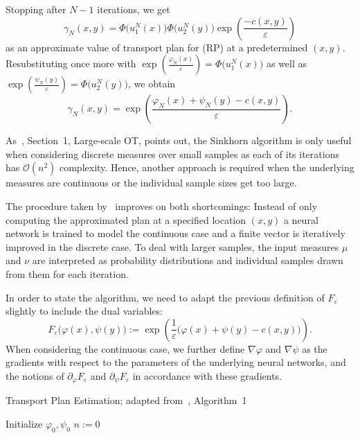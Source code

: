 Stopping after $N - 1$ iterations, we get
\[ \gamma_N(x, y) = \Phi\big( u_1^N(x) \big) \Phi\big( u_2^N(y) \big) \exp\left( \frac{- c(x, y)}{\varepsilon} \right) \]
as an approximate value of transport plan for (RP) at a predetermined $(x, y)$. Resubstituting once more with $\exp\left( \frac{\varphi_N(x)}{\varepsilon} \right) = \Phi\big( u_1^N(x) \big)$ as well as $\exp\left( \frac{\psi_N(y)}{\varepsilon} \right) = \Phi\big( u_2^N(y) \big)$, we obtain
\begin{equation}\label{RegApprTransPlan}
	\gamma_N(x, y) = \exp\left( \frac{\varphi_N(x) + \psi_N(y) - c(x, y)}{\varepsilon} \right).
\end{equation}

As~\cite{Seg2018}, Section~1, Large-scale OT, points out, the Sinkhorn algorithm is only useful when considering discrete measures over small samples as each of its iterations has $\mathcal{O}(n^2)$ complexity. Hence, another approach is required when the underlying measures are continuous or the individual sample sizes get too large.

The procedure taken by~\cite{Seg2018} improves on both shortcomings: Instead of only computing the approximated plan at a specified location $(x, y)$ a neural network is trained to model the continuous case and a finite vector is iteratively improved in the discrete case. To deal with larger samples, the input measures $\mu$ and $\nu$ are interpreted as probability distributions and individual samples drawn from them for each iteration.

In order to state the algorithm, we need to adapt the previous definition of $F_\varepsilon$ slightly to include the dual variables:
\[ F_\varepsilon\big( \varphi(x), \psi(y) \big) := \exp\left( \frac{1}{\varepsilon} \big( \varphi(x) + \psi(y) - c(x, y) \big) \right). \]
When considering the continuous case, we further define $\nabla \varphi$ and $\nabla \psi$ as the gradients with respect to the parameters of the underlying neural networks, and the notions of $\partial_\varphi F_\varepsilon$ and $\partial_\psi F_\varepsilon$ in accordance with these gradients.

\begin{algorithm}\label{OTPlanEstAlg}
	\caption{Transport Plan Estimation; adapted from~\cite{Seg2018}, Algorithm~1}
	Initialize $\varphi_0, \psi_0$\;
	$n := 0$\;
\end{algorithm}

